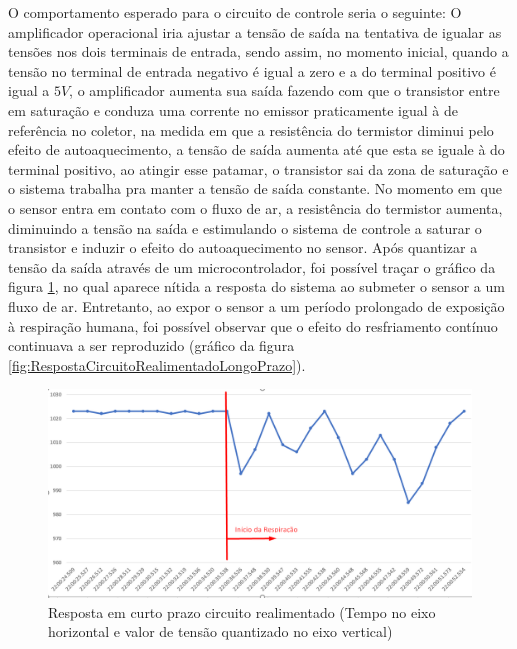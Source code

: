 O comportamento esperado para o circuito de controle seria o seguinte: O amplificador operacional iria ajustar a tensão de saída na tentativa de igualar as tensões nos dois terminais de entrada, sendo assim, no momento inicial, quando a tensão no terminal de entrada negativo é igual a zero e a do terminal positivo é igual a $5V$, o amplificador aumenta sua saída fazendo com que o transistor entre em saturação e conduza uma corrente no emissor praticamente igual à de referência no coletor, na medida em que a resistência do termistor diminui pelo efeito de autoaquecimento, a tensão de saída aumenta até que esta se iguale à do terminal positivo, ao atingir esse patamar, o transistor sai da zona de saturação e o sistema trabalha pra manter a tensão de saída constante. No momento em que o sensor entra em contato com o fluxo de ar, a resistência do termistor aumenta, diminuindo a tensão na saída e estimulando o sistema de controle a saturar o transistor e induzir o efeito do autoaquecimento no sensor. Após quantizar a tensão da saída através de um microcontrolador, foi possível traçar o gráfico da figura \ref{fig:RespostaCircuitoRealimentado}, no qual aparece nítida a resposta do sistema ao submeter o sensor a um fluxo de ar. Entretanto, ao expor o sensor a um período prolongado de exposição à respiração humana, foi possível observar que o efeito do resfriamento contínuo continuava a ser reproduzido (gráfico da figura \ref{fig:RespostaCircuitoRealimentadoLongoPrazo}).


\begin{figure}[h!]
	\begin{center}
		\includegraphics[width=1\linewidth]{images/RespostaCircuitoRealimentado.png}
		\caption{Resposta em curto prazo circuito realimentado (Tempo no eixo horizontal e valor de tensão quantizado no eixo vertical)}
		\label{fig:RespostaCircuitoRealimentado}
	\end{center}
\end{figure}


